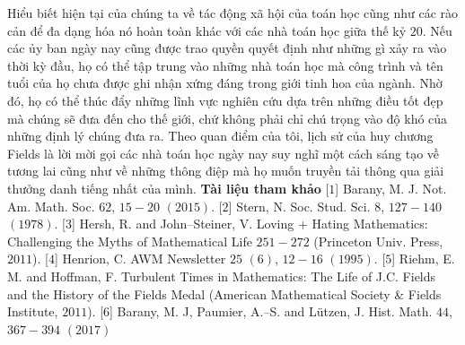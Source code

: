 \begin{multicols}{2}
	\vskip 0.05cm
	Hiểu biết hiện tại của chúng ta về tác động xã hội của toán học cũng như các rào cản để đa dạng hóa nó hoàn toàn khác với các nhà toán học giữa thế kỷ $20$. Nếu các ủy ban ngày nay cũng được trao quyền quyết định như những gì xảy ra vào thời kỳ đầu, họ có thể tập trung vào những nhà toán học mà công trình và tên tuổi của họ chưa được ghi nhận xứng đáng trong giới tinh hoa của ngành. Nhờ đó, họ có thể thúc đẩy những lĩnh vực nghiên cứu dựa trên những điều tốt đẹp mà chúng sẽ đưa đến cho thế giới, chứ không phải chỉ chú trọng vào độ khó của những định lý chúng đưa ra.
	\vskip 0.05cm
	Theo quan điểm của tôi, lịch sử của huy chương Fields là lời mời gọi  các nhà toán học ngày nay suy nghĩ một cách sáng tạo về tương lai cũng như về những thông điệp mà họ muốn truyền tải thông qua giải thưởng danh tiếng nhất của mình.
	\vskip 0.05cm
	\textbf{\color{lichsutoanhoc}Tài liệu tham khảo}
	\vskip 0.05cm
	[$1$] Barany, M. J. Not. Am. Math. Soc. $62$, $15-20$ $(2015)$.
	\vskip 0.05cm
	[$2$] Stern, N. Soc. Stud. Sci. $8$, $127-140$ $(1978)$.
	\vskip 0.05cm
	[$3$] Hersh, R. and John--Steiner, V. Loving + Hating Mathematics: Challenging the Myths of Mathematical Life $251-272$ (Princeton Univ. Press, $2011$). 
	\vskip 0.05cm
	[$4$] Henrion, C. AWM Newsletter $25$ $(6)$, $12-16$ $(1995)$.
	\vskip 0.05cm
	[$5$] Riehm, E. M. and Hoffman, F. Turbulent Times in Mathematics: The Life of J.C. Fields and the History of the Fields Medal (American Mathematical Society \& Fields Institute, $2011$).
	\vskip 0.05cm
	[$6$] Barany, M. J, Paumier, A.--S. and Lützen, J. Hist. Math. $44$, $367-394$ $(2017)$
\end{multicols}
\newpage
{}
\begingroup

